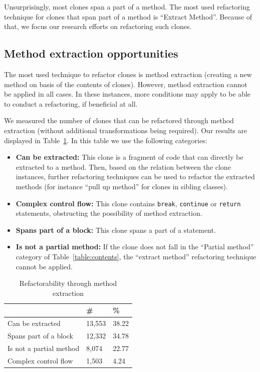 \documentclass[a4paper]{article}
\begin{document}
Unsurprisingly, most clones span a part of a method. The most used refactoring technique for clones that span part of a method is ``Extract Method''. Because of that, we focus our research efforts on refactoring such clones.

\subsection{Method extraction opportunities}\label{chap:mergingdups}
The most used technique to refactor clones is method extraction (creating a new method on basis of the contents of clones). However, method extraction cannot be applied in all cases. In these instances, more conditions may apply to be able to conduct a refactoring, if beneficial at all.

We measured the number of clones that can be refactored through method extraction (without additional transformations being required). Our results are displayed in Table~\ref{table:refactorability}. In this table we use the following categories:
\begin{itemize}
    \item \textbf{Can be extracted:} This clone is a fragment of code that can directly be extracted to a method. Then, based on the relation between the clone instances, further refactoring techniques can be used to refactor the extracted methods (for instance ``pull up method'' for clones in sibling classes).
    \item \textbf{Complex control flow:} This clone contains \texttt{break}, \texttt{continue} or \texttt{return} statements, obstructing the possibility of method extraction.
    \item \textbf{Spans part of a block:} This clone spans a part of a statement.
    \item \textbf{Is not a partial method:} If the clone does not fall in the ``Partial method'' category of Table~\ref{table:contents}, the ``extract method'' refactoring technique cannot be applied.
\end{itemize}

\begin{table}[H]
  \begin{center}
  \caption{Refactorability through method extraction} \label{table:refactorability}
  \medskip
\begin{tabular}{|l|l|l|}
\hline
\textbf{}         & \textbf{\#} & \textbf{\%} \\ \hline
Can be extracted     & 13,553 & 38.22 \\ \hline
Spans part of a block  & 12,332 & 34.78 \\ \hline
Is not a partial method   & 8,074 & 22.77 \\ \hline
Complex control flow & 1,503 & 4.24 \\ \hline
\end{tabular}
\end{center}
\end{table}
\end{document}
